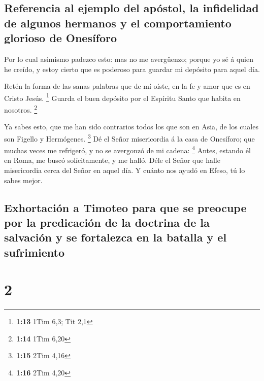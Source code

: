\hypertarget{referencia-al-ejemplo-del-apuxf3stol-la-infidelidad-de-algunos-hermanos-y-el-comportamiento-glorioso-de-onesuxedforo}{%
\subsection{Referencia al ejemplo del apóstol, la infidelidad de algunos
hermanos y el comportamiento glorioso de
Onesíforo}\label{referencia-al-ejemplo-del-apuxf3stol-la-infidelidad-de-algunos-hermanos-y-el-comportamiento-glorioso-de-onesuxedforo}}

 Por lo cual asimismo padezco esto: mas no me avergüenzo;
porque yo sé á quien he creído, y estoy cierto que es poderoso para
guardar mi depósito para aquel día.

 Retén la forma de las sanas palabras que de mí oíste, en
la fe y amor que es en Cristo Jesús. \footnote{\textbf{1:13} 1Tim 6,3;
  Tit 2,1}  Guarda el buen depósito por el Espíritu Santo
que habita en nosotros. \footnote{\textbf{1:14} 1Tim 6,20}

 Ya sabes esto, que me han sido contrarios todos los que
son en Asia, de los cuales son Figello y Hermógenes. \footnote{\textbf{1:15}
  2Tim 4,16}  Dé el Señor misericordia á la casa de
Onesíforo; que muchas veces me refrigeró, y no se avergonzó de mi
cadena: \footnote{\textbf{1:16} 2Tim 4,20}  Antes,
estando él en Roma, me buscó solícitamente, y me halló. 
Déle el Señor que halle misericordia cerca del Señor en aquel día. Y
cuánto nos ayudó en Efeso, tú lo sabes mejor.

\hypertarget{exhortaciuxf3n-a-timoteo-para-que-se-preocupe-por-la-predicaciuxf3n-de-la-doctrina-de-la-salvaciuxf3n-y-se-fortalezca-en-la-batalla-y-el-sufrimiento}{%
\subsection{Exhortación a Timoteo para que se preocupe por la
predicación de la doctrina de la salvación y se fortalezca en la batalla
y el
sufrimiento}\label{exhortaciuxf3n-a-timoteo-para-que-se-preocupe-por-la-predicaciuxf3n-de-la-doctrina-de-la-salvaciuxf3n-y-se-fortalezca-en-la-batalla-y-el-sufrimiento}}

\hypertarget{section-1}{%
\section{2}\label{section-1}}

